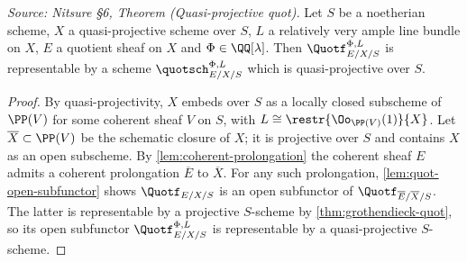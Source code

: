 \begin{theorem}
  \label{thm:quasiprojective-quot}
  \textit{Source: Nitsure §6, Theorem (Quasi-projective quot).}
  Let $S$ be a noetherian scheme, $X$ a quasi-projective scheme over $S$, $L$ a
  relatively very ample line bundle on $X$, $E$ a quotient sheaf on $X$ and
  $\Phi\in\QQ[\lambda]$. Then $\Quotf_{E/X/S}^{\Phi,L}$ is representable by a
  scheme $\quotsch_{E/X/S}^{\Phi,L}$ which is quasi-projective over $S$.
\end{theorem}

\begin{proof}
  By quasi-projectivity, $X$ embeds over $S$ as a locally closed subscheme of
  $\PP(V)$ for some coherent sheaf $V$ on $S$, with
  $L\cong \restr{\Oo_{\PP(V)}(1)}{X}$. Let $\overline X\subset \PP(V)$ be the
  schematic closure of $X$; it is projective over $S$ and contains $X$ as an open
  subscheme. By \cref{lem:coherent-prolongation} the coherent sheaf $E$ admits a
  coherent prolongation $\overline E$ to $\overline X$. For any such prolongation,
  \cref{lem:quot-open-subfunctor} shows $\Quotf_{E/X/S}$ is an open subfunctor of
  $\Quotf_{\overline E/\overline X/S}$. The latter is representable by a
  projective $S$-scheme by \cref{thm:grothendieck-quot}, so its open subfunctor
  $\Quotf_{E/X/S}^{\Phi,L}$ is representable by a quasi-projective $S$-scheme.
\end{proof}

